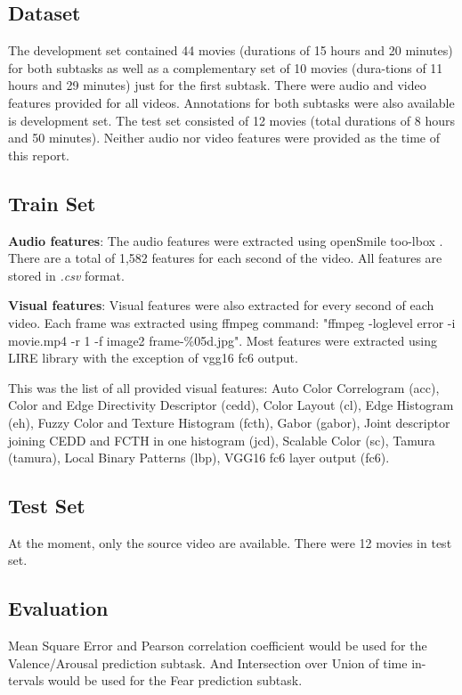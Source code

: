 {\subsection{Dataset}
The development set contained 44 movies (durations of 15 hours and 20 minutes) for both subtasks as well as a complementary set of 10 movies (dura-tions of 11 hours and 29 minutes) just for the first subtask. There were audio and video features provided for all videos. Annotations for both subtasks were also available is development set. The test set consisted of 12 movies (total durations of 8 hours and 50 minutes). Neither audio nor video features were provided as the time of this report.

\subsection{Train Set}

\textbf{Audio features}: The audio features were extracted using openSmile too-lbox \cite{opensmile}. There are a total of 1,582 features for each second of the video. All features are stored in \textit{.csv} format.

\textbf{Visual features}: Visual features were also extracted for every second of each video. Each frame was extracted using ffmpeg command: "ffmpeg -loglevel error -i movie.mp4 -r 1 -f image2 frame-\%05d.jpg". Most features were extracted using LIRE library with the exception of vgg16 fc6 output.

This was the list of all provided visual features: Auto Color Correlogram (acc), Color and Edge Directivity Descriptor (cedd), Color Layout (cl), Edge Histogram (eh), Fuzzy Color and Texture Histogram (fcth), Gabor (gabor), Joint descriptor joining CEDD and FCTH in one histogram (jcd), Scalable Color (sc), Tamura (tamura), Local Binary Patterns (lbp), VGG16 fc6 layer output (fc6).

\subsection{Test Set}
At the moment, only the source video are available. There were 12 movies in test set.

\subsection{Evaluation}
Mean Square Error and Pearson correlation coefficient would be used for the Valence/Arousal prediction subtask. And Intersection over Union of time in-tervals would be used for the Fear prediction subtask.


}
